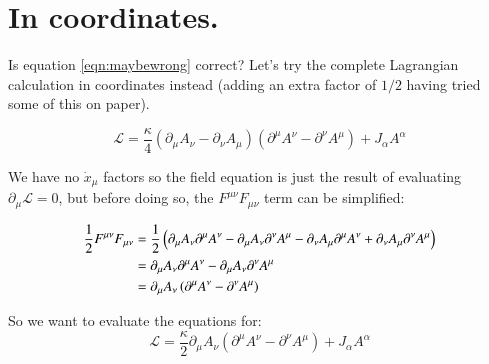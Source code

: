 \documentclass{article}
\newcommand{\LL}[0]{\mathcal{L}}
\begin{document}
\section{ In coordinates. }

Is equation \ref{eqn:maybewrong} correct?  Let's try the complete Lagrangian calculation in coordinates instead (adding an extra factor of $1/2$
having tried some of this on paper).

\begin{equation*}
\LL = \frac{\kappa}{4} ( \partial_{\mu} A_{\nu} - \partial_{\nu} A_{\mu} ) ( \partial^{\mu} A^{\nu} - \partial^{\nu} A^{\mu} ) + J_{\alpha} A^{\alpha}
\end{equation*}

We have no $\dot{x}_{\mu}$ factors so the field equation is just the result of evaluating $\partial_{\mu} \LL = 0$, but before doing so, the $F^{\mu\nu}F_{\mu\nu}$ term can be simplified:

\begin{align*}
\frac{1}{2} F^{\mu\nu}F_{\mu\nu}
&=
\frac{1}{2} \left(
 \partial_{\mu} A_{\nu} \partial^{\mu} A^{\nu}
-\partial_{\mu} A_{\nu} \partial^{\nu} A^{\mu}
-\partial_{\nu} A_{\mu} \partial^{\mu} A^{\nu}
+\partial_{\nu} A_{\mu} \partial^{\nu} A^{\mu} \right) \\
&=
\partial_{\mu} A_{\nu} \partial^{\mu} A^{\nu}
-\partial_{\mu} A_{\nu} \partial^{\nu} A^{\mu} \\
&= \partial_{\mu} A_{\nu} \left( \partial^{\mu} A^{\nu} -\partial^{\nu} A^{\mu} \right) \\
\end{align*}


So we want to evaluate the equations for:
\begin{equation*}
\LL = \frac{\kappa}{2} \partial_{\mu} A_{\nu} ( \partial^{\mu} A^{\nu} - \partial^{\nu} A^{\mu} ) + J_{\alpha} A^{\alpha}
\end{equation*}
\end{document}
